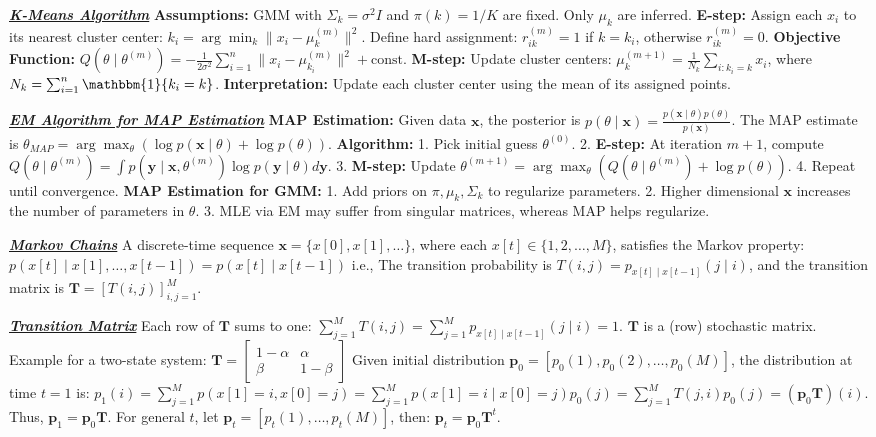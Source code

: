 \documentclass[10pt]{article}
\newcommand{\bulletPoint}[1]{\ul{\textit{\textbf{#1}}}}
\begin{document}
\begin{multicols*}{2}
\bulletPoint{K-Means Algorithm}\quad
\textbf{Assumptions:} GMM with $\Sigma_k = \sigma^2 I$ and $\pi(k) = 1/K$ are fixed. Only $\mu_k$ are inferred. 
\textbf{E-step:} Assign each $x_i$ to its nearest cluster center: $k_i = \arg\min_{k} \|x_i - \mu_k^{(m)}\|^2$. Define hard assignment: $r_{ik}^{(m)} = 1$ if $k = k_i$, otherwise $r_{ik}^{(m)} = 0$. 
\textbf{Objective Function:} $Q(\theta \mid \theta^{(m)}) = -\frac{1}{2\sigma^2} \sum_{i=1}^{n} \|x_i - \mu_{k_i}^{(m)}\|^2 + \text{const}$. 
\textbf{M-step:} Update cluster centers: $\mu_k^{(m+1)} = \frac{1}{N_k} \sum_{i:k_i=k} x_i$, where $N_k = \sum_{i=1}^{n} \mathbbm{1}\{ k_i = k \}$. 
\textbf{Interpretation:} Update each cluster center using the mean of its assigned points.
    
\bulletPoint{EM Algorithm for MAP Estimation}\quad
\textbf{MAP Estimation:} Given data $\mathbf{x}$, the posterior is $p(\theta \mid \mathbf{x}) = \frac{p(\mathbf{x} \mid \theta) p(\theta)}{p(\mathbf{x})}$. The MAP estimate is $\theta_{MAP} = \arg\max_{\theta} \left( \log p(\mathbf{x} \mid \theta) + \log p(\theta) \right)$. 
\textbf{Algorithm:}
1. Pick initial guess $\theta^{(0)}$.
2. \textbf{E-step:} At iteration $m+1$, compute $Q(\theta \mid \theta^{(m)}) = \int p(\mathbf{y} \mid \mathbf{x}, \theta^{(m)}) \log p(\mathbf{y} \mid \theta) d\mathbf{y}$.
3. \textbf{M-step:} Update $\theta^{(m+1)} = \arg\max_{\theta} \left( Q(\theta \mid \theta^{(m)}) + \log p(\theta) \right)$.
4. Repeat until convergence. 
\textbf{MAP Estimation for GMM:}
1. Add priors on $\pi, \mu_k, \Sigma_k$ to regularize parameters.
2. Higher dimensional $\mathbf{x}$ increases the number of parameters in $\theta$.
3. MLE via EM may suffer from singular matrices, whereas MAP helps regularize.
    
\bulletPoint{Markov Chains}\quad
A discrete-time sequence $\mathbf{x} = \{x[0], x[1], \dots\}$, where each $x[t] \in \{1, 2, \dots, M\}$, satisfies the Markov property:
$p(x[t] \mid x[1], \dots, x[t-1]) = p(x[t] \mid x[t-1])$
i.e., The transition probability is $T(i, j) = p_{x[t] \mid x[t-1]}(j \mid i)$, and the transition matrix is $\mathbf{T} = [T(i, j)]_{i,j=1}^{M}$.

\bulletPoint{Transition Matrix}\quad
Each row of $\mathbf{T}$ sums to one: $\sum_{j=1}^{M} T(i, j) = \sum_{j=1}^{M} p_{x[t] \mid x[t-1]}(j \mid i) = 1$.
$\mathbf{T}$ is a (row) stochastic matrix.
Example for a two-state system:
$
\mathbf{T} = \begin{bmatrix} 1 - \alpha & \alpha \\ \beta & 1 - \beta \end{bmatrix}
$
Given initial distribution $\mathbf{p}_0 = [p_0(1), p_0(2), \dots, p_0(M)]$, the distribution at time $t=1$ is:
$p_1(i) = \sum_{j=1}^{M} p(x[1] = i, x[0] = j) = \sum_{j=1}^{M} p(x[1] = i \mid x[0] = j) p_0(j) = \sum_{j=1}^{M} T(j, i) p_0(j) = ( \mathbf{p}_0 \mathbf{T} )(i)$.
Thus, $\mathbf{p}_1 = \mathbf{p}_0 \mathbf{T}$. For general $t$, let $\mathbf{p}_t = [p_t(1), \dots, p_t(M)]$, then: $\mathbf{p}_t = \mathbf{p}_0 \mathbf{T}^t$.



\end{multicols*}
\end{document}
